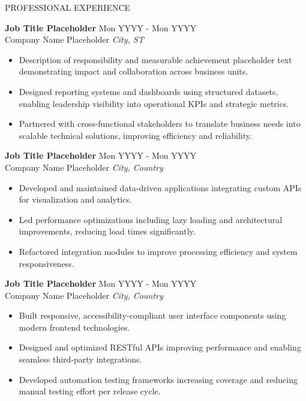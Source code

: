 \documentclass{resume} %
\begin{document}
\begin{rSection}{PROFESSIONAL EXPERIENCE}

\textbf{Job Title Placeholder} \hfill Mon YYYY - Mon YYYY\\
Company Name Placeholder \hfill \textit{City, ST}
\vspace*{-1mm}
 \begin{itemize}
    \itemsep -3pt {} 
     \item Description of responsibility and measurable achievement placeholder text demonstrating impact and collaboration across business units.
     \item Designed reporting systems and dashboards using structured datasets, enabling leadership visibility into operational KPIs and strategic metrics.
     \item Partnered with cross-functional stakeholders to translate business needs into scalable technical solutions, improving efficiency and reliability.
 \end{itemize}
\vspace*{-1mm}

\textbf{Job Title Placeholder} \hfill Mon YYYY - Mon YYYY\\
Company Name Placeholder \hfill \textit{City, Country}
\vspace*{-1mm}
 \begin{itemize}
    \itemsep -3pt {} 
     \item Developed and maintained data-driven applications integrating custom APIs for visualization and analytics.
     \item Led performance optimizations including lazy loading and architectural improvements, reducing load times significantly.
     \item Refactored integration modules to improve processing efficiency and system responsiveness.
 \end{itemize}
\vspace*{-1mm}

{\textbf{Job Title Placeholder}} \hfill Mon YYYY - Mon YYYY\\
Company Name Placeholder \hfill \textit{City, Country}
\vspace*{-1mm}
 \begin{itemize}
    \itemsep -3pt {} 
     \item Built responsive, accessibility-compliant user interface components using modern frontend technologies.
     \item Designed and optimized RESTful APIs improving performance and enabling seamless third-party integrations.
     \item Developed automation testing frameworks increasing coverage and reducing manual testing effort per release cycle.
 \end{itemize}


\end{rSection}
\end{document}
